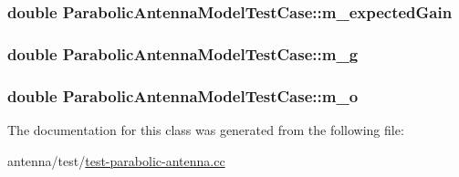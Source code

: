 \subsubsection[{\texorpdfstring{m\+\_\+expected\+Gain}{m_expectedGain}}]{\setlength{\rightskip}{0pt plus 5cm}double Parabolic\+Antenna\+Model\+Test\+Case\+::m\+\_\+expected\+Gain\hspace{0.3cm}{\ttfamily [private]}}\hypertarget{classParabolicAntennaModelTestCase_ad9e9cf3db4f01deaec594b62d9000652}{}\label{classParabolicAntennaModelTestCase_ad9e9cf3db4f01deaec594b62d9000652}
\subsubsection[{\texorpdfstring{m\+\_\+g}{m_g}}]{\setlength{\rightskip}{0pt plus 5cm}double Parabolic\+Antenna\+Model\+Test\+Case\+::m\+\_\+g\hspace{0.3cm}{\ttfamily [private]}}\hypertarget{classParabolicAntennaModelTestCase_a09563db4a4afb154d43d8fe10804ed72}{}\label{classParabolicAntennaModelTestCase_a09563db4a4afb154d43d8fe10804ed72}
\subsubsection[{\texorpdfstring{m\+\_\+o}{m_o}}]{\setlength{\rightskip}{0pt plus 5cm}double Parabolic\+Antenna\+Model\+Test\+Case\+::m\+\_\+o\hspace{0.3cm}{\ttfamily [private]}}\hypertarget{classParabolicAntennaModelTestCase_a7a7993a6ec28b5cf48260fdddce9a2cc}{}\label{classParabolicAntennaModelTestCase_a7a7993a6ec28b5cf48260fdddce9a2cc}


The documentation for this class was generated from the following file\+:\begin{DoxyCompactItemize}
\item 
antenna/test/\hyperlink{test-parabolic-antenna_8cc}{test-\/parabolic-\/antenna.\+cc}\end{DoxyCompactItemize}

